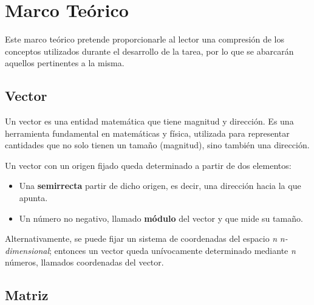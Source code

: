 \documentclass{article}
\begin{document}
\section{Marco Teórico}\label{sec:marco-teorico}
    Este marco teórico pretende proporcionarle al lector una compresión de los conceptos utilizados durante el
    desarrollo de la tarea, por lo que se abarcarán aquellos pertinentes a la misma.

\subsection{Vector}\label{subsec:vector}
    Un vector es una entidad matemática que tiene magnitud y dirección.
    Es una herramienta fundamental en matemáticas y física, utilizada para representar cantidades que no solo tienen
    un tamaño (magnitud), sino también una dirección.

    Un vector con un origen fijado queda determinado a partir de dos elementos:
    \begin{itemize}
        \item Una \textbf{semirrecta} partir de dicho origen, es decir, una dirección hacia la que apunta.
        \item Un número no negativo, llamado \textbf{módulo} del vector y que mide su tamaño.
    \end{itemize}

    Alternativamente, se puede fijar un sistema de coordenadas del espacio \textit{n} \textit{n-dimensional};
    entonces un vector queda unívocamente determinado mediante \textit{n} números, llamados coordenadas del vector.

\subsection{Matriz}\label{subsec:matrix}
    
\end{document}
